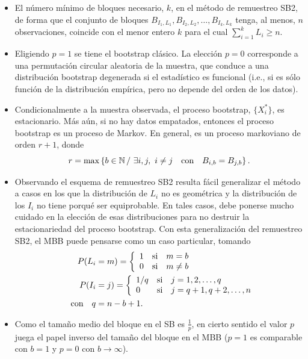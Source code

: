\documentclass[]{book}
\theoremstyle{definition}
\theoremstyle{definition}
\theoremstyle{definition}
\theoremstyle{remark}
\begin{document}
\begin{itemize}
\item
  El número mínimo de bloques necesario, \(k\), en el método de
  remuestreo SB2, de forma que el conjunto de bloques
  \(B_{I_1,L_1},B_{I_2,L_2},\ldots ,B_{I_{k},L_{k}}\) tenga, al menos,
  \(n\) observaciones, coincide con el menor entero \(k\) para el cual
  \(\sum_{i=1}^{k}L_i\geq n\).
\item
  Eligiendo \(p=1\) se tiene el bootstrap clásico. La elección \(p=0\)
  corresponde a una permutación circular aleatoria de la muestra, que
  conduce a una distribución bootstrap degenerada si el estadístico es
  funcional (i.e., si es sólo función de la distribución empírica, pero
  no depende del orden de los datos).
\item
  Condicionalmente a la muestra observada, el proceso bootstrap,
  \(\{X_i^{\ast}\}\), es estacionario. Más aún, si no hay datos
  empatados, entonces el proceso bootstrap es un proceso de Markov. En
  general, es un proceso markoviano de orden \(r+1\), donde
  \[r=\max \left\{ b\in \mathbb{N}\,/\,\,\exists i,j,\,\,i\neq j\quad \hbox{con}
  \quad B_{i,b}=B_{j,b}\right\} .\]
\item
  Observando el esquema de remuestreo SB2 resulta fácil generalizar el
  método a casos en los que la distribución de \(L_i\) no es geométrica
  y la distribución de los \(I_i\) no tiene porqué ser equiprobable. En
  tales casos, debe ponerse mucho cuidado en la elección de esas
  distribuciones para no destruir la estacionariedad del proceso
  bootstrap. Con esta generalización del remuestreo SB2, el MBB puede
  pensarse como un caso particular, tomando \[\begin{aligned}
  P(L_i &= m)=\left\{ 
  \begin{array}{lll}
  1 & \mathrm{si} & m=b \\ 
  0 & \mathrm{si} & m\neq b
  \end{array}
     \right. \\
  P(I_i &= j)=\left\{ 
  \begin{array}{lll}
  1/q & \mathrm{si} & j=1,2,\ldots ,q \\ 
  0 & \mathrm{si} & j=q+1,q+2,\ldots ,n
  \end{array}
     \right. \\
  \quad \hbox{con}\quad q&= n-b+1.\end{aligned}\]
\item
  Como el tamaño medio del bloque en el SB es \(\frac{1}{p}\), en cierto
  sentido el valor \(p\) juega el papel inverso del tamaño del bloque en
  el MBB (\(p=1\) es comparable con \(b=1\) y \(p=0\) con
  \(b\rightarrow \infty\)).
\end{itemize}
\end{document}
